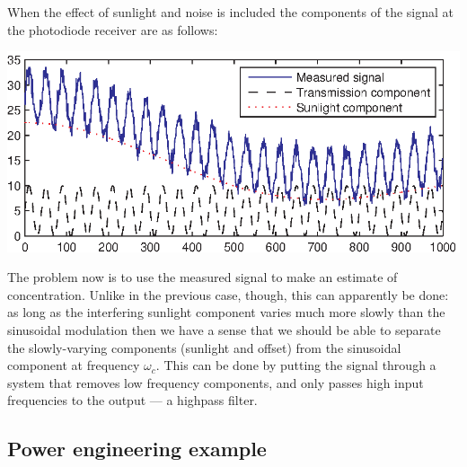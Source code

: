\documentclass[10pt]{beamer}
\begin{document}
When the effect of sunlight and noise is included the components of the signal at the photodiode receiver are as follows:
\begin{center}
  \includegraphics{me_example2}
\end{center}
\vspace*{0.2ex}
The problem now is to use the measured signal to make an estimate of concentration.  Unlike in the previous case, though, this can apparently be done:  as long as the interfering sunlight component varies much more slowly than the sinusoidal modulation then we have a sense that we should be able to separate the slowly-varying components (sunlight and offset) from the sinusoidal component at frequency $\omega_c$.  This can be done by putting the signal through a system that removes low frequency components, and only passes high input frequencies to the output --- a highpass filter.

\subsection{Power engineering example}
\end{document}

